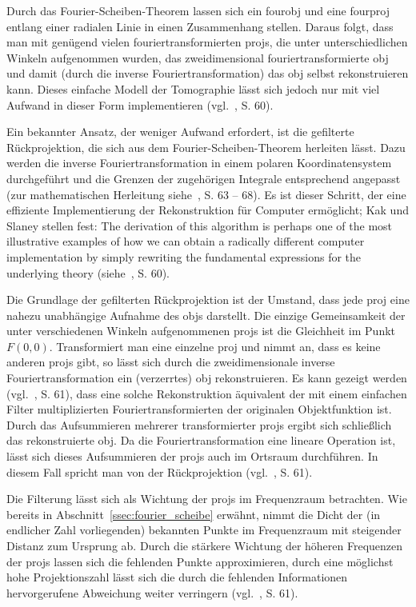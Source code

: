 Durch das Fourier-Scheiben-Theorem lassen sich ein \gls{fourobj} und eine \gls{fourproj} entlang einer radialen Linie in
einen Zusammenhang stellen. Daraus folgt, dass man mit genügend vielen fouriertransformierten \glspl{proj}, die unter
unterschiedlichen Winkeln aufgenommen wurden, das zweidimensional fouriertransformierte \gls{obj} und damit (durch die
inverse Fouriertransformation) das \gls{obj} selbst rekonstruieren kann. Dieses einfache Modell der Tomographie lässt
sich jedoch nur mit viel Aufwand in dieser Form implementieren (vgl.~\cite{kakslan}, S. 60).

Ein bekannter Ansatz, der weniger Aufwand erfordert, ist die gefilterte Rückprojektion, die sich aus dem
Fourier-Scheiben-Theorem herleiten lässt. Dazu werden die inverse Fouriertransformation in einem polaren Koordinatensystem
durchgeführt und die Grenzen der zugehörigen Integrale entsprechend angepasst (zur mathematischen Herleitung
siehe~\cite{kakslan}, S. 63 -- 68). Es ist dieser Schritt, der eine effiziente Implementierung der Rekonstruktion für
Computer ermöglicht; Kak und Slaney stellen fest: {\glqq}The derivation of this algorithm is perhaps one of the most
illustrative examples of how we can obtain a radically different computer implementation by simply rewriting the
fundamental expressions for the underlying theory{\grqq} (siehe~\cite{kakslan}, S. 60).

Die Grundlage der gefilterten Rückprojektion ist der Umstand, dass jede \gls{proj} eine nahezu unabhängige Aufnahme des
\gls{obj}s darstellt. Die einzige Gemeinsamkeit der unter verschiedenen Winkeln aufgenommenen \glspl{proj} ist die
Gleichheit im Punkt $F(0, 0)$. Transformiert man eine einzelne \gls{proj} und nimmt an, dass es keine anderen
\glspl{proj} gibt, so lässt sich durch die zweidimensionale inverse Fouriertransformation ein (verzerrtes) \gls{obj}
rekonstruieren. Es kann gezeigt werden (vgl.~\cite{kakslan}, S. 61), dass eine solche Rekonstruktion äquivalent der mit
einem einfachen Filter multiplizierten Fouriertransformierten der originalen Objektfunktion ist. Durch das Aufsummieren
mehrerer transformierter \glspl{proj} ergibt sich schließlich das rekonstruierte \gls{obj}. Da die Fouriertransformation
eine lineare Operation ist, lässt sich dieses Aufsummieren der \glspl{proj} auch im Ortsraum durchführen. In diesem Fall
spricht man von der Rückprojektion (vgl.~\cite{kakslan}, S. 61).

Die Filterung lässt sich als Wichtung der \glspl{proj} im Frequenzraum betrachten. Wie bereits in
Abschnitt~\ref{ssec:fourier_scheibe} erwähnt, nimmt die Dicht der (in endlicher Zahl vorliegenden) bekannten
Punkte im Frequenzraum mit steigender Distanz zum Ursprung ab. Durch die stärkere Wichtung der höheren Frequenzen der
\glspl{proj} lassen sich die fehlenden Punkte approximieren, durch eine möglichst hohe Projektionszahl lässt sich die
durch die fehlenden Informationen hervorgerufene Abweichung weiter verringern (vgl.~\cite{kakslan}, S. 61).

